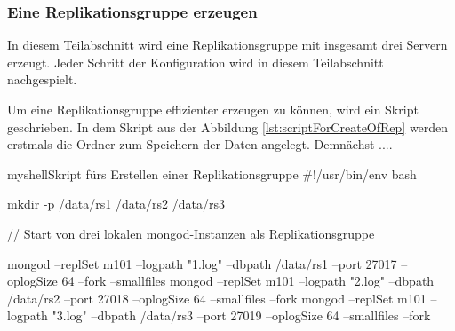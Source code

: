 %


\subsubsection{Eine Replikationsgruppe erzeugen}
In diesem Teilabschnitt wird eine Replikationsgruppe mit insgesamt drei Servern erzeugt. Jeder Schritt der Konfiguration wird in diesem Teilabschnitt nachgespielt.

Um eine Replikationsgruppe effizienter erzeugen zu können, wird ein Skript geschrieben. In dem Skript aus der Abbildung \ref{lst:scriptForCreateOfRep} werden erstmals die Ordner zum Speichern der Daten angelegt. Demnächst ....

\begin{listingsboxShell}[label={lst:scriptForCreateOfRep}]{myshell}{Skript fürs Erstellen einer Replikationsgruppe}
#!/usr/bin/env bash

mkdir -p /data/rs1 /data/rs2 /data/rs3

// Start von drei lokalen mongod-Instanzen als Replikationsgruppe

mongod --replSet m101 --logpath "1.log" --dbpath /data/rs1 --port 27017
--oplogSize 64 --fork --smallfiles
mongod --replSet m101 --logpath "2.log" --dbpath /data/rs2 --port 27018
--oplogSize 64 --smallfiles --fork
mongod --replSet m101 --logpath "3.log" --dbpath /data/rs3 --port 27019
--oplogSize 64 --smallfiles --fork
\end{listingsboxShell}

